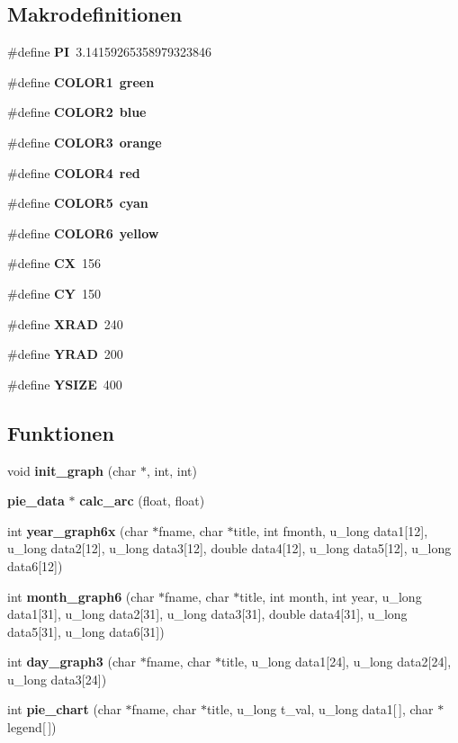 \subsection*{Makrodefinitionen}
\begin{CompactItemize}
\item 
\#define {\bf PI}~3.14159265358979323846
\item 
\#define {\bf COLOR1}~{\bf green}
\item 
\#define {\bf COLOR2}~{\bf blue}
\item 
\#define {\bf COLOR3}~{\bf orange}
\item 
\#define {\bf COLOR4}~{\bf red}
\item 
\#define {\bf COLOR5}~{\bf cyan}
\item 
\#define {\bf COLOR6}~{\bf yellow}
\item 
\#define {\bf CX}~156
\item 
\#define {\bf CY}~150
\item 
\#define {\bf XRAD}~240
\item 
\#define {\bf YRAD}~200
\item 
\#define {\bf YSIZE}~400
\end{CompactItemize}
\subsection*{Funktionen}
\begin{CompactItemize}
\item 
void {\bf init\_\-graph} (char $\ast$, int, int)
\item 
{\bf pie\_\-data} $\ast$ {\bf calc\_\-arc} (float, float)
\item 
int {\bf year\_\-graph6x} (char $\ast$fname, char $\ast$title, int fmonth, u\_\-long data1[12], u\_\-long data2[12], u\_\-long data3[12], double data4[12], u\_\-long data5[12], u\_\-long data6[12])
\item 
int {\bf month\_\-graph6} (char $\ast$fname, char $\ast$title, int month, int year, u\_\-long data1[31], u\_\-long data2[31], u\_\-long data3[31], double data4[31], u\_\-long data5[31], u\_\-long data6[31])
\item 
int {\bf day\_\-graph3} (char $\ast$fname, char $\ast$title, u\_\-long data1[24], u\_\-long data2[24], u\_\-long data3[24])
\item 
int {\bf pie\_\-chart} (char $\ast$fname, char $\ast$title, u\_\-long t\_\-val, u\_\-long data1[$\,$], char $\ast$legend[$\,$])
\end{CompactItemize}
